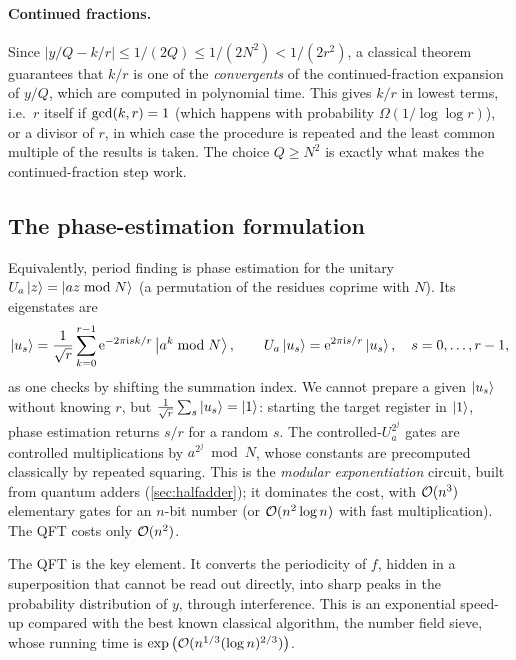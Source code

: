 \paragraph{Continued fractions.} Since $|y/Q-k/r|\le1/(2Q)\le1/(2N^2)<1/(2r^2)$, a classical theorem guarantees that $k/r$ is one of the \emph{convergents} of the continued-fraction expansion of $y/Q$, which
are computed in polynomial time. This gives $k/r$ in lowest terms, i.e.\ $r$ itself if $\operatorname{gcd}(k,r)=1$ (which happens with probability $\Omega(1/\log\log r)$), or a divisor of $r$, in which case the procedure is
repeated and the least common multiple of the results is taken. The choice $Q\ge N^2$ is exactly what makes the continued-fraction step work.

\subsection{The phase-estimation formulation}
Equivalently, period finding is phase estimation for the unitary $U_a\left|z\right\rangle=\left|az\bmod N\right\rangle$ (a permutation of the residues coprime with $N$). Its eigenstates are
\begin{equation}
  \left|u_s\right\rangle=\frac1{\sqrt r}\sum_{k=0}^{r-1}\mathrm e^{-2\pi\mathrm i sk/r}\left|a^k\bmod N\right\rangle,\qquad U_a\left|u_s\right\rangle=\mathrm e^{2\pi\mathrm i s/r}\left|u_s\right\rangle,\quad s=0,\dots,r-1,
\end{equation}
as one checks by shifting the summation index. We cannot prepare a given $\left|u_s\right\rangle$ without knowing $r$, but $\frac1{\sqrt r}\sum_s\left|u_s\right\rangle=\left|1\right\rangle$: starting the target register in $\left|1\right\rangle$, phase estimation returns
$s/r$ for a random $s$. The controlled-$U_a^{2^j}$ gates are controlled multiplications by $a^{2^j}\bmod N$, whose constants are precomputed classically by repeated squaring. This is the \emph{modular
exponentiation} circuit, built from quantum adders (\cref{sec:halfadder}); it dominates the cost, with $\mathcal O(n^3)$ elementary gates for an $n$-bit number (or $\mathcal O(n^2\log n)$ with fast multiplication).
The QFT costs only $\mathcal O(n^2)$.

\begin{keypoint}
The QFT is the key element. It converts the periodicity of $f$, hidden in a superposition that cannot be read out directly, into sharp peaks in the probability distribution of $y$, through interference.
This is an exponential speed-up compared with the best known classical algorithm, the number field sieve, whose running time is $\exp\left(\mathcal O(n^{1/3}(\log n)^{2/3})\right)$.
\end{keypoint}

